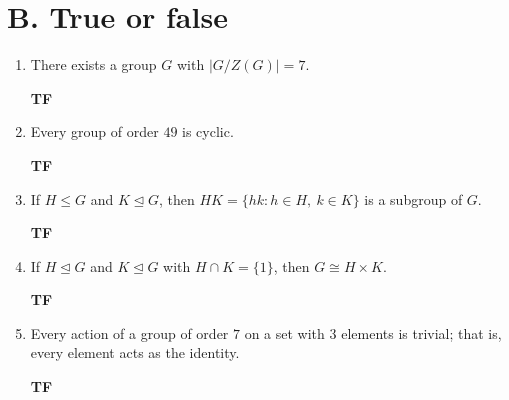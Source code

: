 \documentclass[11pt,letterpaper]{article}
\newif\ifsolutions
\newcommand{\sol}[1]{\ifsolutions\par\smallskip{\color{blue!50!black}\textbf{Answer.} #1}\fi}
\newcommand{\TF}{\hfill\textbf{T\quad F}}
\begin{document}
\section*{B. True or false}
\begin{enumerate}[label=\textbf{B\arabic*.}]
\item \parbox[t]{0.86\linewidth}{There exists a group $G$ with $|G/Z(G)|=7$.}\TF
\sol{False. A group of order $7$ is cyclic. If $G/Z(G)$ is cyclic, then $G$ is abelian, so $Z(G)=G$ and $|G/Z(G)|=1$.}

\item \parbox[t]{0.86\linewidth}{Every group of order $49$ is cyclic.}\TF
\sol{False. Every group of order $p^2$ is abelian, but $C_7\times C_7$ has order $49$ and is not cyclic, since every non-identity element has order $7$.}

\item \parbox[t]{0.86\linewidth}{If $H\leq G$ and $K\trianglelefteq G$, then $HK=\{hk:h\in H,\ k\in K\}$ is a subgroup of $G$.}\TF
\sol{True. Normality of $K$ gives $HK=KH$, and this implies that $HK$ is closed under products and inverses. Only one of the two subgroups needs to be normal.}

\item \parbox[t]{0.86\linewidth}{If $H\trianglelefteq G$ and $K\trianglelefteq G$ with $H\cap K=\{1\}$, then $G\cong H\times K$.}\TF
\sol{False. The condition $HK=G$ is also needed. For example, take $G=S_3$, $H=A_3$, and $K=\{1\}$. Both are normal and $H\cap K=\{1\}$, but $H\times K\cong C_3\not\cong S_3$.}

\item \parbox[t]{0.86\linewidth}{Every action of a group of order $7$ on a set with $3$ elements is trivial; that is, every element acts as the identity.}\TF
\sol{True. The action gives a homomorphism $\rho:G\to S_3$. By the first isomorphism theorem, $|\operatorname{im}\rho|$ divides $|G|=7$, and by Lagrange it divides $|S_3|=6$. Thus $\operatorname{im}\rho$ is trivial. An orbit-size argument also works: each orbit size divides $7$ and is at most $3$, so every orbit has size $1$.}
\end{enumerate}
\end{document}
